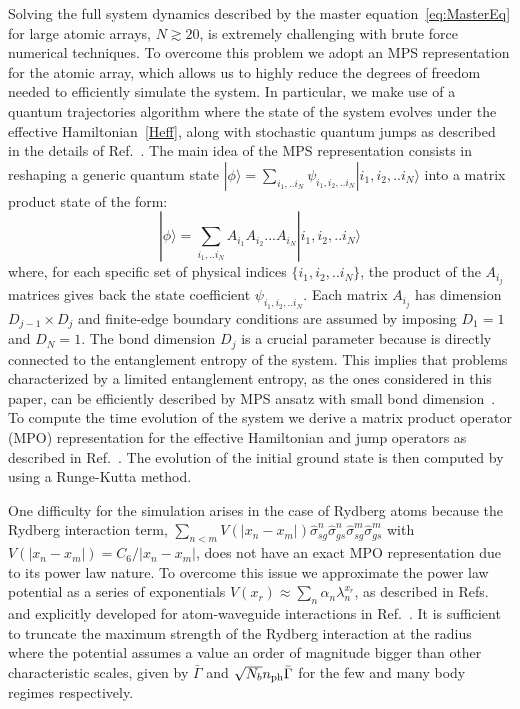 \documentclass[pra,twocolumn,showpacs,preprintnumbers,amsmath,amssymb]{revtex4-1}
\begin{document}
Solving the full system dynamics described by the master equation~\eqref{eq:MasterEq} for large atomic arrays, $N\gtrsim 20$, is extremely challenging with brute force numerical techniques.
To overcome this problem we adopt an MPS representation for the atomic array, which allows us to highly reduce the degrees of freedom needed to efficiently simulate the system. In particular, we make use of a quantum trajectories algorithm where the state of the system evolves under the effective Hamiltonian~\eqref{Heff}, along with stochastic quantum jumps as described in the details of Ref.~\cite{MPSJames}.
The main idea of the MPS representation consists in 
reshaping a generic quantum state $|\phi\rangle=\sum_{i_1,..i_N}\psi_{i_1,i_2,..i_N}|i_1,i_2,..i_N\rangle$ into a matrix product state of the form:
%
\begin{equation}
|\phi\rangle=\sum_{i_1,..i_N}A_{i_1}A_{i_2}...A_{i_N}|i_1,i_2,..i_N\rangle
\end{equation}
%
where, for each specific set of physical indices $\{i_1,i_2,..i_N\}$, the product of the $A_{ i_j}$ matrices gives back the state coefficient $\psi_{ i_1, i_2,.. i_N}$. Each matrix $A_{ i_j}$ has dimension $D_{j-1}\times D_{j}$ and finite-edge boundary conditions are assumed by imposing $D_{1}=1$ and $D_{N}=1$. 
The bond dimension $D_j$ is a crucial parameter because is directly connected to the entanglement entropy of the system. This implies that problems characterized  
by a limited entanglement entropy, as the ones considered in this paper, 
can be efficiently described by MPS ansatz with small bond dimension~\cite{Verstraete,Schollw}.
To compute the time evolution of the system we derive a matrix product operator (MPO) representation for the effective Hamiltonian and jump operators as described in Ref.~\cite{MPSJames}. The evolution of the initial ground state is then 
computed by using a Runge-Kutta method.

One difficulty for the simulation arises in the case of Rydberg atoms because the Rydberg interaction term, $\sum_{n<m}V(|x_n-x_m|)\hat\sigma^n_{sg}\hat\sigma^n_{gs}\hat\sigma^m_{sg}\hat\sigma^m_{gs}$ with  $V(|x_n-x_m|)=C_6/|x_n-x_m|$, does not have an exact MPO representation due to its power law nature. To overcome this issue we approximate the power law potential as a series of exponentials $V(x_r)\approx \sum_n\alpha_n\lambda_n^{x_r}$, as described in Refs.~\cite{Pirvu,Crosswhite,fro} and explicitly developed for atom-waveguide interactions in Ref.~\cite{james_ryd}. It is sufficient to truncate the maximum strength of the Rydberg interaction at the radius where the potential assumes a value an order of magnitude bigger than other characteristic scales, given by $\bar \Gamma$ and $\sqrt{N_b} n_{\rm ph}\bar \Gamma$ for the few and many body regimes respectively.
\end{document}
